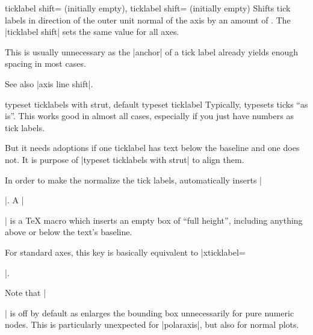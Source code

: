 \begin{pgfplotsxykeylist}{%
    \x ticklabel shift= (initially empty),
       ticklabel shift= (initially empty)%
}
    Shifts tick labels in direction of the outer unit normal of the axis by an
    amount of . The |ticklabel shift| sets the same value for
    all axes.

    This is usually unnecessary as the |anchor| of a tick label already yields
    enough spacing in most cases.

    See also |axis line shift|.
\end{pgfplotsxykeylist}

\begin{pgfplotskeylist}{%
    typeset ticklabels with strut,
    default typeset ticklabel%
}
    Typically, \PGFPlots{} typesets ticks ``as is''. This works good in almost
    all cases, especially if you just have numbers as tick labels.

    But it needs adoptions if one ticklabel has text below the baseline and one
    does not. It is purpose of |typeset ticklabels with strut| to align them.
\begin{codeexample}[]
\end{codeexample}

    In order to make the normalize the tick labels, \PGFPlots{} automatically
    inserts |\strut|. A |\strut| is a \TeX{} macro which inserts an empty box
    of ``full height'', including anything above or below the text's baseline.

    For standard axes, this key is basically equivalent to
    |xticklabel=\strut\pgfmathprintnumber{\tick}|.

    Note that |\strut| is off by default as enlarges the bounding box
    unnecessarily for pure numeric nodes. This is particularly unexpected for
    |polaraxis|, but also for normal plots.
\end{pgfplotskeylist}


